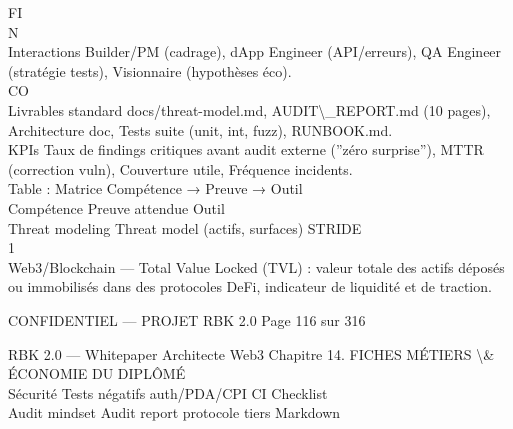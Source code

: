 \documentclass[12pt,landscape,a4paper]{article}
\newenvironment{confidential}
{\begin{tcolorbox}[
    colback=rbkred!5!white,
    colframe=rbkred!75!black,
    title=CONFIDENTIEL,
    fonttitle=\bfseries\color{white},
    coltitle=rbkred!75!black,
    breakable,
    enhanced,
    frame hidden,
    borderline west={2pt}{0pt}{rbkred!75!black}
]}
{\end{tcolorbox}}
\begin{document}
\vspace{0.5em}
\vspace{0.5em}
\vspace{0.5em}
\vspace{0.5em}
FI\\
N\\
Interactions Builder/PM (cadrage), dApp Engineer (API/erreurs), QA Engineer (stratégie tests), Visionnaire (hypothèses éco).\\
CO\\
Livrables standard          docs/threat-model.md, AUDIT\textbackslash{}_REPORT.md (10 pages), Architecture doc, Tests suite (unit, int, fuzz), RUNBOOK.md.\\
\vspace{0.5em}
\vspace{0.5em}
KPIs Taux de findings critiques avant audit externe (”zéro surprise”), MTTR (correction vuln), Couverture utile, Fréquence incidents.\\
\vspace{0.5em}
Table : Matrice Compétence → Preuve → Outil\\
\vspace{0.5em}
Compétence      Preuve attendue                 Outil\\
Threat modeling Threat model (actifs, surfaces) STRIDE\\
\vspace{0.5em}
\vspace{0.5em}
1\\
Web3/Blockchain — Total Value Locked (TVL) : valeur totale des actifs déposés ou immobilisés dans des protocoles DeFi, indicateur de liquidité et de traction.\\
\vspace{0.5em}
\vspace{0.5em}
\begin{confidential}CONFIDENTIEL — PROJET RBK 2.0                                            Page 116 sur 316\end{confidential}
RBK 2.0 — Whitepaper Architecte Web3                                                         Chapitre 14. FICHES MÉTIERS \textbackslash{}& ÉCONOMIE DU DIPLÔMÉ\\
\vspace{0.5em}
\vspace{0.5em}
\vspace{0.5em}
Sécurité          Tests négatifs auth/PDA/CPI       CI Checklist\\
Audit mindset     Audit report protocole tiers      Markdown\\
\end{document}
